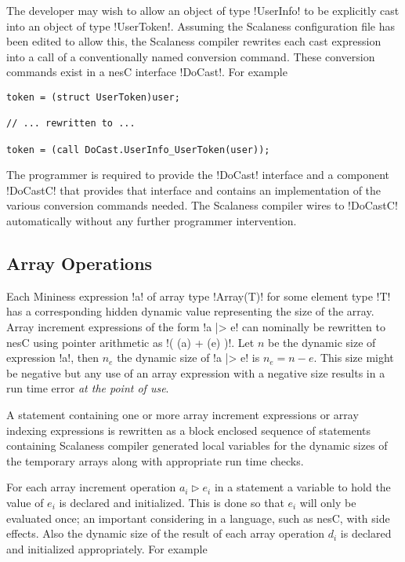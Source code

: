 The developer may wish to allow an object of type !UserInfo! to be explicitly cast into an
object of type !UserToken!. Assuming the Scalaness configuration file has been edited to allow
this, the Scalaness compiler rewrites each cast expression into a call of a conventionally named
conversion command. These conversion commands exist in a nesC interface !DoCast!. For example

\singlespace
\begin{lstlisting}[language=nesC]
token = (struct UserToken)user;

// ... rewritten to ...

token = (call DoCast.UserInfo_UserToken(user));
\end{lstlisting}
\primaryspacing

The programmer is required to provide the !DoCast! interface and a component !DoCastC! that
provides that interface and contains an implementation of the various conversion commands
needed. The Scalaness compiler wires to !DoCastC! automatically without any further programmer
intervention.


\subsection{Array Operations}
\label{section-array-operations}

Each Mininess expression !a! of array type !Array(T)! for some element type !T! has a
corresponding hidden dynamic value representing the size of the array. Array increment
expressions of the form !a |> e! can nominally be rewritten to nesC using pointer arithmetic as
!( (a) + (e) )!. Let $n$ be the dynamic size of expression !a!, then $n_e$ the dynamic size of
!a |> e! is $n_e = n - e$. This size might be negative but any use of an array expression with a
negative size results in a run time error \emph{at the point of use}.

A statement containing one or more array increment expressions or array indexing expressions is
rewritten as a block enclosed sequence of statements containing Scalaness compiler generated
local variables for the dynamic sizes of the temporary arrays along with appropriate run time
checks.

For each array increment operation $a_i \rhd e_i$ in a statement a variable to hold the value of
$e_i$ is declared and initialized. This is done so that $e_i$ will only be evaluated once; an
important considering in a language, such as nesC, with side effects. Also the dynamic size of
the result of each array operation $d_i$ is declared and initialized appropriately. For example

